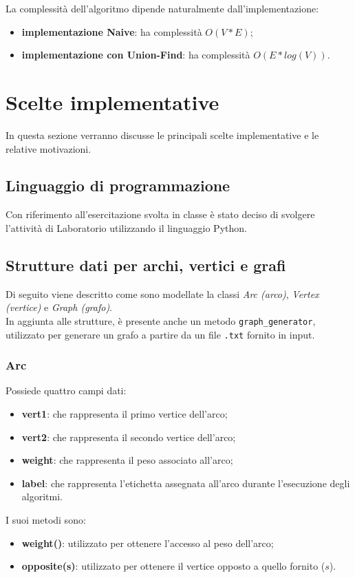 La complessità dell'algoritmo dipende naturalmente dall'implementazione:
\begin{itemize}
	\item \textbf{implementazione Naive}: ha complessità $O(V*E)$;
	\item \textbf{implementazione con Union-Find}: ha complessità $O(E*log(V))$.
\end{itemize}

\pagebreak
\section{Scelte implementative}
In questa sezione verranno discusse le principali scelte implementative e le relative motivazioni.
\subsection{Linguaggio di programmazione}
Con riferimento all'esercitazione svolta in classe è stato deciso di svolgere l'attività di Laboratorio utilizzando il linguaggio Python.
\subsection{Strutture dati per archi, vertici e grafi}
Di seguito viene descritto come sono modellate la classi \textit{Arc (arco)}, \textit{Vertex (vertice)} e \textit{Graph (grafo)}. \\
In aggiunta alle strutture, è presente anche un metodo \texttt{graph\_generator}, utilizzato per generare un grafo a partire da un file \texttt{.txt} fornito in input.
\subsubsection{Arc}
Possiede quattro campi dati:
\begin{itemize}
	\item \textbf{vert1}: che rappresenta il primo vertice dell'arco;
	\item \textbf{vert2}: che rappresenta il secondo vertice dell'arco;
	\item \textbf{weight}: che rappresenta il peso associato all'arco;
	\item \textbf{label}: che rappresenta l'etichetta assegnata all'arco durante l'esecuzione degli algoritmi.
\end{itemize}
I suoi metodi sono:
\begin{itemize}
	\item \textbf{weight()}: utilizzato per ottenere l'accesso al peso dell'arco;
	\item \textbf{opposite(s)}: utilizzato per ottenere il vertice opposto a quello fornito ($s$).
\end{itemize}
